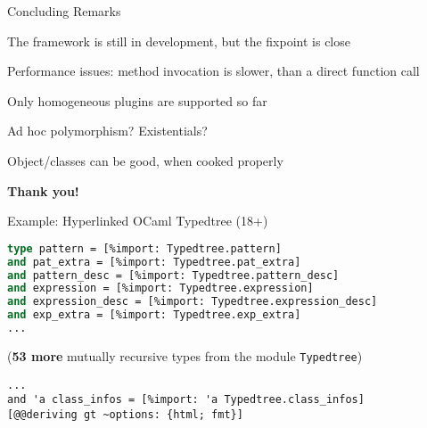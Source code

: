 \documentclass{beamer}
\theoremstyle{definition}
\theoremstyle{plain} %
\begin{document}
\begin{frame}[fragile]{Concluding Remarks}

  The framework is still in development, but the fixpoint is close
  \vskip5mm
  
  Performance issues: method invocation is slower, than a direct function call
  \vskip5mm
  
  Only homogeneous plugins are supported so far
  \vskip5mm
  
  Ad hoc polymorphism? Existentials?
  \vskip5mm
  
  Object/classes can be good, when cooked properly
  
\end{frame}

\begin{frame}[fragile]

  \begin{center}
    {\textbf{\Large Thank you!}}
  \end{center}

\end{frame}

\begin{frame}[fragile]{Example: Hyperlinked OCaml Typedtree (18+)}
\begin{lstlisting}[language=ocaml] 
type pattern = [%import: Typedtree.pattern]
and pat_extra = [%import: Typedtree.pat_extra]
and pattern_desc = [%import: Typedtree.pattern_desc]
and expression = [%import: Typedtree.expression]
and expression_desc = [%import: Typedtree.expression_desc]
and exp_extra = [%import: Typedtree.exp_extra]
...    
\end{lstlisting}

(\textbf{53 more} mutually recursive types from the module \lstinline[basicstyle=\large]|Typedtree|)

\begin{lstlisting}
...   
and 'a class_infos = [%import: 'a Typedtree.class_infos]
[@@deriving gt ~options: {html; fmt}]
\end{lstlisting}
\end{frame}


\begin{comment}
  This slide shows the redefinition for a binding position (namely, in patterns). As we said earlier, a full-fledged
  support for mutually-recursive types is tricky. Here the transformation class is additionally parameterized
  by a collection of transformation functions for all members of mutually-recursive cluster of types (called here
  \lstinline|mut_trfs|). Thus, along with \lstinline|fself|, it represents the second level of open recursion. Besides that,
  nothing is particularly interesting or non-trivial here, just some boring HTML stuff.
\end{comment}
\end{document}
